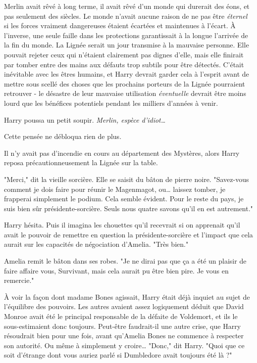 Merlin avait rêvé à long terme, il avait rêvé d'un monde qui durerait des éons, et pas seulement des siècles. Le monde n'avait aucune raison de ne pas être \emph{éternel}  si les forces vraiment dangereuses étaient écartées et maintenues à l'écart. À l'inverse, une seule faille dans les protections garantissait à la longue l'arrivée de la fin du monde. La Lignée serait un jour transmise à la mauvaise personne. Elle pouvait rejeter ceux qui n'étaient clairement pas dignes d'elle, mais elle finirait par tomber entre des mains aux défauts trop subtils pour être détectés. C'était inévitable avec les êtres humains, et Harry devrait garder cela à l'esprit avant de mettre sous scellé des choses que les prochains porteurs de la Lignée pourraient retrouver - le désastre de leur mauvaise utilisation \emph{éventuelle}  devrait être moins lourd que les bénéfices potentiels pendant les milliers d'années à venir.

Harry poussa un petit soupir. \emph{Merlin, espèce d'idiot…} 

Cette pensée ne débloqua rien de plus.

Il n'y avait pas d'incendie en cours au département des Mystères, alors Harry reposa précautionneusement la Lignée sur la table.

"Merci," dit la vieille sorcière. Elle se saisit du bâton de pierre noire. "Savez-vous comment je dois faire pour réunir le Magenmagot, ou… laissez tomber, je frapperai simplement le podium. Cela semble évident. Pour le reste du pays, je suis bien sûr présidente-sorcière. Seuls nous quatre savons qu'il en est autrement."

Harry hésita. Puis il imagina les chouettes qu'il recevrait si on apprenait qu'il avait le pouvoir de remettre en question la présidente-sorcière et l'impact que cela aurait sur les capacités de négociation d'Amelia. "Très bien."

Amelia remit le bâton dans ses robes. "Je ne dirai pas que ça a été un plaisir de faire affaire vous, Survivant, mais cela aurait pu être bien pire. Je vous en remercie."

À voir la façon dont madame Bones agissait, Harry était déjà inquiet au sujet de l'équilibre des pouvoirs. Les autres avaient assez logiquement déduit que David Monroe avait été le principal responsable de la défaite de Voldemort, et ils le sous-estimaient donc toujours. Peut-être faudrait-il une autre crise, que Harry résoudrait bien pour une fois, avant qu'Amelia Bones ne commence à respecter son autorité. Ou même à simplement y croire… "Donc," dit Harry. "Quoi que ce soit d'étrange dont vous auriez parlé si Dumbledore avait toujours été là ?"

